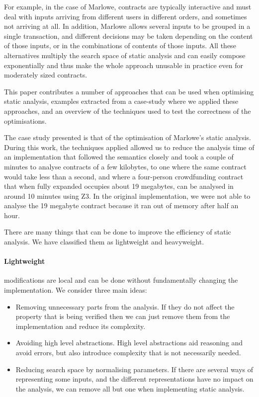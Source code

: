 \documentclass[english,runningheads]{llncs}
\begin{document}
For example, in the case of Marlowe, contracts are typically interactive
and must deal with inputs arriving from different users in different
orders, and sometimes not arriving at all. In addition, Marlowe allows
several inputs to be grouped in a single transaction, and different
decisions may be taken depending on the content of those inputs, or
in the combinations of contents of those inputs. All these alternatives
multiply the search space of static analysis and can easily compose
exponentially and thus make the whole approach unusable in practice
even for moderately sized contracts.

This paper contributes a number of approaches that can be used when
optimising static analysis, examples extracted from a case-study where
we applied these approaches, and an overview of the techniques used
to test the correctness of the optimisations. 

The case study presented is that of the optimisation of Marlowe's
static analysis. During this work, the techniques applied allowed
us to reduce the analysis time of an implementation that followed
the semantics closely and took a couple of minutes to analyse contracts
of a few kilobytes, to one where the same contract would take less
than a second, and where a four-person crowdfunding contract that
when fully expanded occupies about 19 megabytes, can be analysed in
around 10 minutes using Z3. In the original implementation, we were
not able to analyse the 19 megabyte contract because it ran out of
memory after half an hour.

There are many things that can be done to improve the efficiency of
static analysis. We have classified them as lightweight and heavyweight. 

\paragraph*{Lightweight }

modifications are local and can be done without fundamentally changing
the implementation. We consider three main ideas:
\begin{itemize}
\item Removing unnecessary parts from the analysis. If they do not affect
the property that is being verified then we can just remove them from
the implementation and reduce its complexity.
\item Avoiding high level abstractions. High level abstractions aid reasoning
and avoid errors, but also introduce complexity that is not necessarily
needed.
\item Reducing search space by normalising parameters. If there are several
ways of representing some inputs, and the different representations
have no impact on the analysis, we can remove all but one when
implementing static analysis.
\end{itemize}
\end{document}

